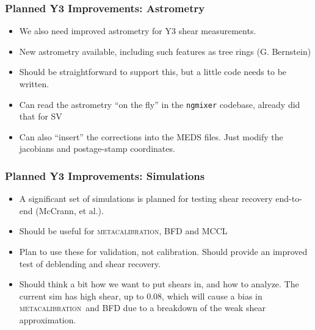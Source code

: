 \documentclass{beamer}
\newcommand{\mcal}{\textsc{metacalibration}}
\begin{document}
\frame
{
    \frametitle{Planned Y3 Improvements: Astrometry}

    \begin{itemize}

        \item We also need improved astrometry for Y3 shear measurements.

        \item New astrometry available, including such features as tree rings
            (G. Bernstein)

        \item Should be straightforward to support this, but a little code
            needs to be written.

        \item Can read the astrometry ``on the fly'' in the \texttt{ngmixer}
            codebase, already did that for SV

        \item Can also ``insert'' the corrections into the MEDS files.   Just
            modify the jacobians and postage-stamp coordinates.

    \end{itemize}

}

\frame
{
    \frametitle{Planned Y3 Improvements: Simulations}

    \begin{itemize}

        \item A significant set of simulations is planned
            for testing shear recovery end-to-end (McCrann, et al.).

        \item Should be useful for \mcal, BFD and MCCL

        \item Plan to use these for validation, not calibration.  
            Should provide an improved test of deblending and
            shear recovery.

        \item Should think a bit how we want to put shears in, and how to
            analyze.  The current sim has high shear, up to 0.08, which will
            cause a bias in \mcal\ and BFD due to a breakdown of the weak shear
            approximation.

    \end{itemize}

}
\end{document}
